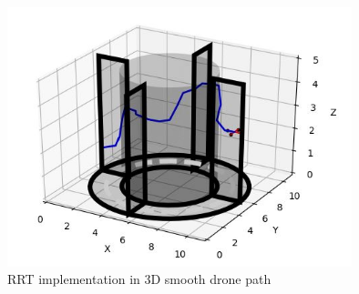 \documentclass{IEEEtran}
\begin{document}
\begin{figure}[h]
    \centering
    \includegraphics[width=10cm]{rrt3dsmoothdrone}
    \caption{RRT implementation in 3D smooth drone path}
    \label{fig:RRT implementation in 3D smooth drone path}
\end{figure}
\end{document}
